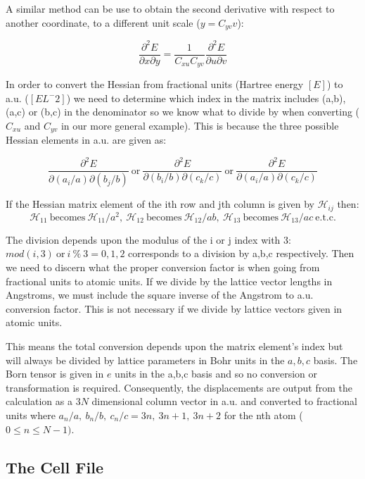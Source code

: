 \documentclass[10pt]{article}
\begin{document}
A similar method can be use to obtain the second derivative with respect to another coordinate, to a different unit scale ($y = C_{yv}v$):

$$\frac{\partial^2 E}{\partial x \partial y} = \frac{1}{C_{xu}C_{yv}}\frac{\partial^2 E}{\partial u \partial v}$$

In order to convert the Hessian from fractional units (Hartree energy $[E]$) to a.u. ($[E L^-2]$) we need to determine which index in the matrix includes (a,b), (a,c) or (b,c) in the denominator so we know what to divide by when converting ($C_{xu}$ and $C_{yv}$ in our more general example). This is because the three possible Hessian elements in a.u. are given as:


$$\frac{\partial^2E}{\partial(a_i/a)\partial(b_j/b)} \ \text{or} \ \frac{\partial^2E}{\partial(b_i/b)\partial(c_k/c)} \ \text{or} \ \frac{\partial^2E}{\partial(a_i/a)\partial(c_k/c)}$$

If the Hessian matrix element of the ith row and jth column is given by $\mathcal{H}_{ij}$ then:
$$\mathcal{H}_{11} \ \text{becomes} \ \mathcal{H}_{11}/a^2, \ \mathcal{H}_{12} \ \text{becomes} \ \mathcal{H}_{12}/ab, \ \mathcal{H}_{13} \ \text{becomes} \ \mathcal{H}_{13}/ac \ \text{e.t.c.}$$ 

The division depends upon the modulus of the i or j index with 3: $mod(i,3) \ \text{or} \ i \ \% \ 3 = 0,1,2$ corresponds to a division by a,b,c respectively. Then we need to discern what the proper conversion factor is when going from fractional units to atomic units. If we divide by the lattice vector lengths in Angstroms, we must include the square inverse of the Angstrom to a.u. conversion factor. This is not necessary if we divide by lattice vectors given in atomic units.

This means the total conversion depends upon the matrix element's index but will always be divided by lattice parameters in Bohr units in the $a, b, c$ basis. The Born tensor is given in $e$ units in the a,b,c basis and so no conversion or transformation is required. Consequently, the displacements are output from the calculation as a $3N$ dimensional column vector in a.u. and converted to fractional units where $a_n/a, \ b_n/b,\ c_n/c = 3n,\ 3n+1,\ 3n+2$ for the nth atom ($0\leq n \leq N-1)$.

\subsection{The Cell File}
\end{document}

